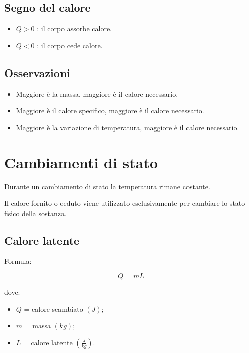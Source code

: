 \subsection{Segno del calore}

\begin{itemize}
    \item $Q>0$ : il corpo assorbe calore.
    \item $Q<0$ : il corpo cede calore.
\end{itemize}

\vspace{0.3cm}

\subsection{Osservazioni}

\begin{itemize}
    \item Maggiore è la massa, maggiore è il calore necessario.
    \item Maggiore è il calore specifico, maggiore è il calore necessario.
    \item Maggiore è la variazione di temperatura, maggiore è il calore necessario.
\end{itemize}

\section{Cambiamenti di stato}

Durante un cambiamento di stato la temperatura rimane costante.

\noindent Il calore fornito o ceduto viene utilizzato esclusivamente per cambiare lo stato fisico della sostanza.

\vspace{0.3cm}

\subsection{Calore latente}

Formula:

\[
Q=mL
\]

\noindent dove:

\begin{itemize}
    \item $Q$ = calore scambiato $(J)$;
    \item $m$ = massa $(kg)$;
    \item $L$ = calore latente $\left(\frac{J}{kg}\right)$.
\end{itemize}

